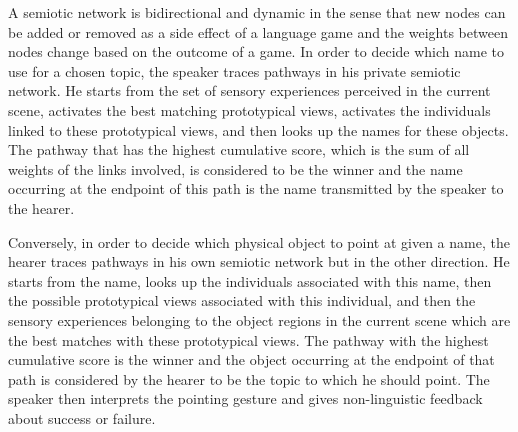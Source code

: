 A semiotic network  is bidirectional and dynamic in the sense that new nodes can be added or
removed as a side effect of a language game and the weights between
nodes change based on the outcome of a game. In
order to decide which name to use for a chosen topic, the speaker
traces pathways in his private semiotic network. He starts from the
set of sensory experiences perceived in the current scene, activates
the best matching prototypical views, activates the individuals
linked to these prototypical views, and then looks up the names for
these objects. The pathway that has the highest cumulative score,
which is the sum of all weights of the links involved, is considered
to be the winner and the name occurring at the endpoint of this path
is the name transmitted by the speaker to the hearer. 

Conversely, in order to decide which physical object to point at given a name, the hearer
traces pathways in his own semiotic network but in the other
direction. He starts from the name, looks up the individuals
associated with this name, then the possible prototypical views
associated with this individual, and then the sensory
experiences belonging to the object regions in the current scene which
are the best matches with these prototypical views. The pathway with
the highest cumulative score is the winner and the object occurring at
the endpoint of that path is considered by the hearer to be the topic
to which he should point. The speaker then interprets the pointing
gesture and gives non-linguistic feedback about success or failure.

